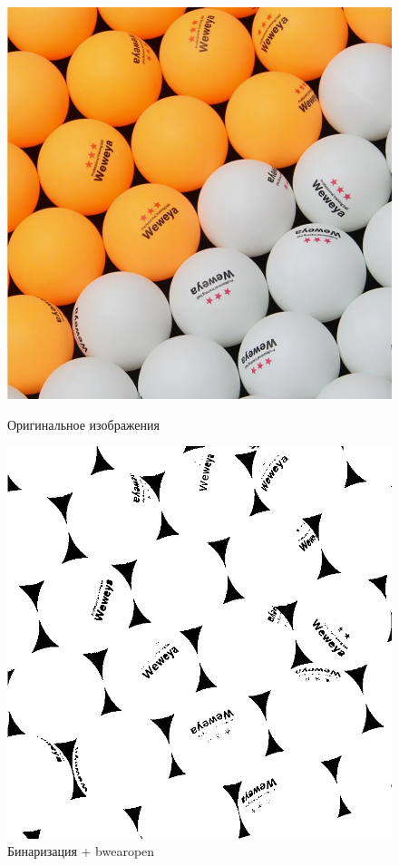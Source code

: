 \begin{figure}[!htb]
    \includegraphics[width=\linewidth]{../img/original/balls.png}
    \caption{Оригинальное изображения}
    \endminipage\hfill
    \includegraphics[width=\linewidth]{../img/outputs/segmentation_watershed/balls_bwearopen.png}
    \caption{Бинаризация + bwearopen}
    \endminipage\hfill
\end{figure}
